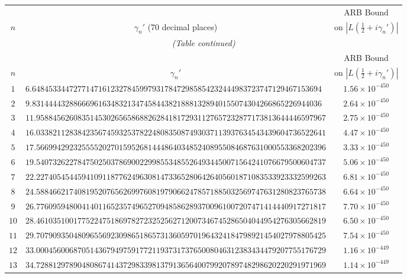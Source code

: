 \documentclass[12pt,reqno]{amsart}
\theoremstyle{plain}
\theoremstyle{definition}
\theoremstyle{remark}
\begin{document}
\renewcommand{\arraystretch}{1.1}
\setlength{\LTleft}{\fill}
\setlength{\LTright}{\fill}
\footnotesize
\begin{longtable}{clc}
\toprule
 & & ARB Bound \\
$n$ & \multicolumn{1}{c}{$\gamma_n'$ (70 decimal places)} & on $|L(\tfrac{1}{2}+i\gamma_n')|$ \\
\midrule
\endfirsthead
\multicolumn{3}{c}{\small\itshape (Table continued)} \\
\toprule
 & & ARB Bound \\
$n$ & \multicolumn{1}{c}{$\gamma_n'$} & on $|L(\tfrac{1}{2}+i\gamma_n')|$ \\
\midrule
\endhead
\bottomrule
\endlastfoot
$1$ & $6.6484533447277147161232784599793178472985854232444983723747129467153694$ & $1.56 \times 10^{-450}$ \\
$2$ & $9.8314444328866696163483213474584438218881328940155074304266865226944036$ & $2.64 \times 10^{-450}$ \\
$3$ & $11.9588456260835145302656586882628418172931127657232877173813644446597967$ & $2.75 \times 10^{-450}$ \\
$4$ & $16.0338211283842356745932537822480835087493037113937634543439604736522641$ & $4.47 \times 10^{-450}$ \\
$5$ & $17.5669942923255552027015952681444864034852408955084687631000553368202396$ & $3.33 \times 10^{-450}$ \\
$6$ & $19.5407326227847502503786900229985534855264934450071564241076679500604737$ & $5.06 \times 10^{-450}$ \\
$7$ & $22.2274054544594109118776249630814733652806426405601871083533923332599263$ & $6.81 \times 10^{-450}$ \\
$8$ & $24.5884662174081952076562699760819790662478571885032569747631280823765738$ & $6.64 \times 10^{-450}$ \\
$9$ & $26.7760959480041401165235749652709485862893700961007207471414440917271817$ & $7.70 \times 10^{-450}$ \\
$10$ & $28.4610351001775224751869782723252562712007346745286504044954276305662819$ & $6.50 \times 10^{-450}$ \\
$11$ & $29.7079093504809655692309865186573136059701964324184798921454027978805425$ & $7.54 \times 10^{-450}$ \\
$12$ & $33.0004560068705143679497591772119373173765008046312383434479207755176729$ & $1.16 \times 10^{-449}$ \\
$13$ & $34.7288129789048086741437298339813791365640079920789748298620220291971969$ & $1.14 \times 10^{-449}$ \\

\end{longtable}
\end{document}
